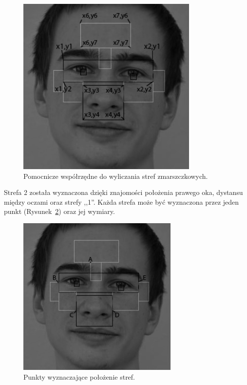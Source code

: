 \documentclass[a4paper,twoside,12pt]{book}
\begin{document}
    \begin{figure}
        \centering
        \includegraphics[width=9cm]{Obrazy/wspolrzedneDoWyliczeniaStref.jpg}
        \caption{Pomocnicze współrzędne do wyliczania stref zmarszczkowych.}
        \label{fig.wspolrzedneDoWyliczeniaStref}
    \end{figure}

    Strefa 2 została wyznaczona dzięki znajomości położenia prawego oka, dystansu między oczami oraz strefy ,,1''.
    Każda strefa może być wyznaczona przez jeden punkt (Rysunek~\ref{fig.wykrywanieStrefZmarszczkowychPunkty})
    oraz jej wymiary.

    \begin{figure}
        \centering
        \includegraphics[width=8cm]{Obrazy/wykrywanieStrefZmarszczkowychPunkty.jpg}
        \caption{Punkty wyznaczające położenie stref.}
        \label{fig.wykrywanieStrefZmarszczkowychPunkty}
    \end{figure}
\end{document}
